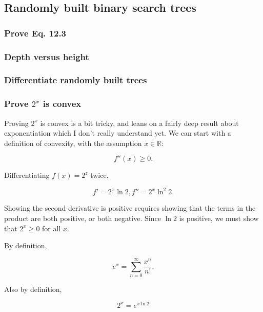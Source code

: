 \documentclass{article}
\begin{document}

\subsection{Randomly built binary search trees}

\subsubsection{Prove Eq. 12.3}

\subsubsection{Depth versus height}

\subsubsection{Differentiate randomly built trees}


\subsubsection{Prove $2^x$ is convex}

Proving $2^x$ is convex is a bit tricky, and leans on a fairly deep result about
exponentiation which I don't really understand yet. We can start with a definition
of convexity, with the assumption $x\in\mathbb{R}$:

\begin{equation}
  f''(x) \geq 0.
\end{equation}

Differentiating $f(x) = 2^z$ twice,

\begin{equation}
  f' = 2^x \ln 2, f'' = 2^x\ln^2 2.
\end{equation}

Showing the second derivative is positive requires showing that the
terms in the product are both positive, or both negative. Since $\ln 2$
is positive, we must show that $2^x \geq 0$ for all $x$.

By definition,

\begin{equation}\label{eq:exp_series}
  e^x = \sum_{n=0}^\infty \frac{x^n}{n!}.
\end{equation}

Also by definition,

\begin{equation}\label{eq:log2}
  2^x = e^{x\ln 2}
\end{equation}
\end{document}
